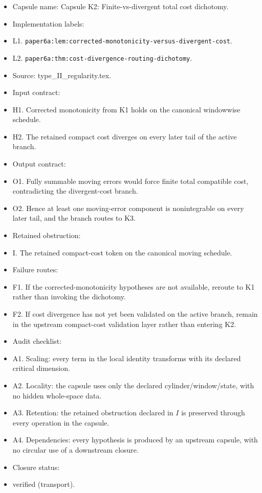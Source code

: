 \documentclass[11pt]{amsart}
\begin{document}
\begin{itemize}
  \item Capsule name: Capsule K2: Finite-vs-divergent total cost dichotomy.
  \item Implementation labels:
  \item L1. \texttt{paper6a:lem:corrected-monotonicity-versus-divergent-cost}.
  \item L2. \texttt{paper6a:thm:cost-divergence-routing-dichotomy}.
  \item Source: type\_II\_regularity.tex.
  \item Input contract:
  \item H1. Corrected monotonicity from K1 holds on the canonical windowwise schedule.
  \item H2. The retained compact cost diverges on every later tail of the active branch.
  \item Output contract:
  \item O1. Fully summable moving errors would force finite total compatible cost, contradicting the divergent-cost branch.
  \item O2. Hence at least one moving-error component is nonintegrable on every later tail, and the branch routes to K3.
  \item Retained obstruction:
  \item I. The retained compact-cost token on the canonical moving schedule.
  \item Failure routes:
  \item F1. If the corrected-monotonicity hypotheses are not available, reroute to K1 rather than invoking the dichotomy.
  \item F2. If cost divergence has not yet been validated on the active branch, remain in the upstream compact-cost validation layer rather than entering K2.
  \item Audit checklist:
  \item A1. Scaling: every term in the local identity transforms with its declared critical dimension.
  \item A2. Locality: the capsule uses only the declared cylinder/window/state, with no hidden whole-space data.
  \item A3. Retention: the retained obstruction declared in $I$ is preserved through every operation in the capsule.
  \item A4. Dependencies: every hypothesis is produced by an upstream capsule, with no circular use of a downstream closure.
  \item Closure status:
  \item verified (transport).
\end{itemize}
\end{document}
